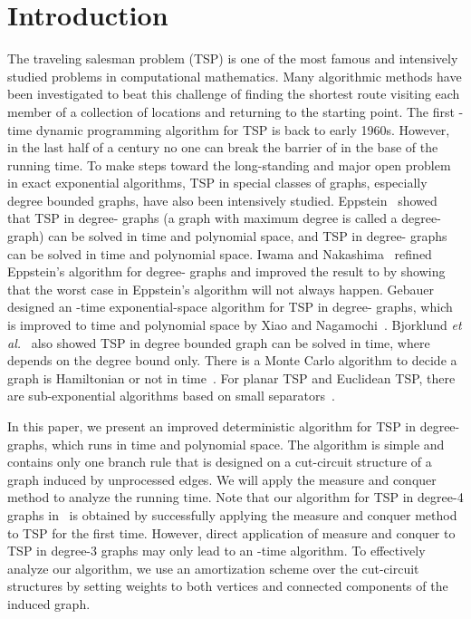 \documentclass[runningheads]{llncs}
\begin{document}
\section{Introduction}
The traveling salesman problem (TSP) is one of the most famous and intensively studied problems in computational mathematics. Many algorithmic methods have been investigated to beat this challenge of finding the shortest route visiting each member of a collection of  locations and returning to the starting point.
 The first -time dynamic programming algorithm for TSP is back to early 1960s.
 However, in the last half of a century no one can break the barrier of  in the base of the running time.
To make steps toward the long-standing and major open problem in exact exponential algorithms,
TSP in special classes of graphs, especially degree bounded graphs, have also been intensively studied.
Eppstein~\cite{Eppstein:TSP3} showed that TSP in degree- graphs (a graph with maximum degree  is called a degree- graph) can be solved in  time and polynomial space, and TSP in degree- graphs can be solved in  time and polynomial space. Iwama and Nakashima~\cite{Iwama:TSP3} refined Eppstein's algorithm for degree- graphs and improved the result to  by showing that the worst case in Eppstein's algorithm will not always happen. Gebauer~\cite{Gebauer:TSP4} designed an -time exponential-space algorithm for TSP in degree- graphs,
which is improved to   time and polynomial space by
Xiao and Nagamochi~\cite{XN:tsp4}.
Bjorklund \emph{et al.}~\cite{Bjorklund:TSPbounded} also showed TSP in degree bounded graph can be solved in  time, where  depends on the degree bound only. There is a Monte Carlo algorithm to decide a graph is Hamiltonian or not in  time~\cite{Bjorklund:Hamiltonicity}. For planar TSP and Euclidean TSP, there are sub-exponential algorithms based on small separators~\cite{Dorn:Planar}.

In this paper, we present an improved deterministic algorithm for TSP in degree- graphs, which runs in  time and polynomial space. The algorithm is simple and contains only
one branch rule that is designed on a cut-circuit structure of a graph induced by unprocessed edges.
We will apply the measure and conquer method to analyze the running time. Note that our algorithm for TSP
in degree-4 graphs in~\cite{XN:tsp4} is obtained by successfully applying the measure and conquer method to TSP for the first time. However, direct application of measure and conquer to TSP in degree-3 graphs may only lead to an -time algorithm. To effectively analyze our algorithm, we use an amortization scheme over the cut-circuit structures by setting weights to both vertices and connected components of the induced graph.
\end{document}
